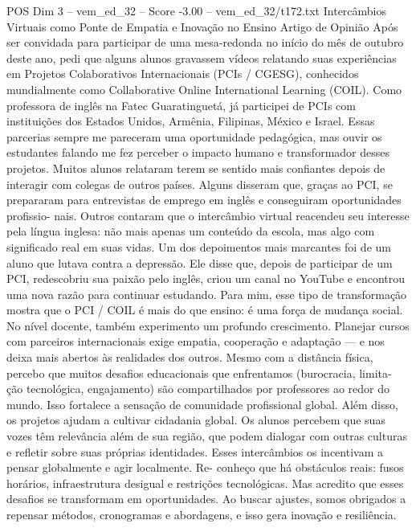 \begin{textsample}{POS Dim 3 – vem\_ed\_32 – Score -3.00 – vem\_ed\_32/t172.txt}  \label{ex:f3_pos_098}
Intercâmbios Virtuais como Ponte de Empatia e Inovação no Ensino Artigo de Opinião Após ser convidada para participar de uma mesa-redonda no início do mês de outubro deste ano, pedi que alguns alunos gravassem vídeos relatando suas experiências em Projetos Colaborativos Internacionais (PCIs / CGESG), conhecidos mundialmente como Collaborative Online International Learning (COIL).
Como professora de inglês na Fatec Guaratinguetá, já participei de PCIs com instituições dos Estados Unidos, Armênia, Filipinas, México e Israel.
Essas parcerias sempre me pareceram uma oportunidade pedagógica, mas ouvir os estudantes falando me fez perceber o impacto humano e transformador desses projetos.
Muitos alunos relataram terem se sentido mais confiantes depois de interagir com colegas de outros países.
Alguns disseram que, graças ao PCI, se prepararam para entrevistas de emprego em inglês e conseguiram oportunidades profissio- nais.
Outros contaram que o intercâmbio virtual reacendeu seu interesse pela língua inglesa: não mais apenas um conteúdo da escola, mas algo com significado real em suas vidas.
Um dos depoimentos mais marcantes foi de um aluno que lutava contra a depressão.
Ele disse que, depois de participar de um PCI, redescobriu sua paixão pelo inglês, criou um canal no YouTube e encontrou uma nova razão para continuar estudando.
Para mim, esse tipo de transformação mostra que o PCI / COIL é mais do que ensino: é uma força de mudança social.
No nível docente, também experimento um profundo crescimento.
Planejar cursos com parceiros internacionais exige empatia, cooperação e adaptação — e nos deixa mais abertos às realidades dos outros.
Mesmo com a distância física, percebo que muitos desafios educacionais que enfrentamos (burocracia, limita- ção tecnológica, engajamento) são compartilhados por professores ao redor do mundo.
Isso fortalece a sensação de comunidade profissional global.
Além disso, os projetos ajudam a cultivar cidadania global.
Os alunos percebem que suas vozes têm relevância além de sua região, que podem dialogar com outras culturas e refletir sobre suas próprias identidades.
Esses intercâmbios os incentivam a pensar globalmente e agir localmente.
Re- conheço que há obstáculos reais: fusos horários, infraestrutura desigual e restrições tecnológicas.
Mas acredito que esses desafios se transformam em oportunidades.
Ao buscar ajustes, somos obrigados a repensar métodos, cronogramas e abordagens, e isso gera inovação e resiliência.

\end{textsample}
